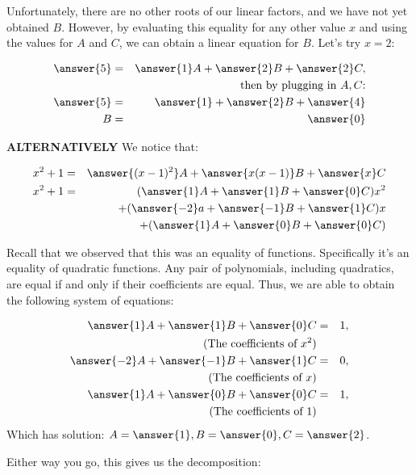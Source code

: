 \documentclass{ximera}
\begin{document}
\begin{explanation}
Unfortunately, there are no other roots of our linear factors, and we have not yet obtained $B$.  However, by evaluating this equality for any other value $x$ and using the values for $A$ and $C$, we can obtain a linear equation for $B$.  Let's try $x=2$:

\begin{eqnarray*}
\answer{5}&=&\answer{1}A+\answer{2}B+\answer{2}C,\\
&& \text{then by plugging in $A,C$:}\\
\answer{5}&=&\answer{1}+\answer{2}B+\answer{4}\\
B&=&\answer{0}
\end{eqnarray*}

\textbf{ALTERNATIVELY} We notice that:

\begin{eqnarray*}
x^2+1&=&\answer{(x-1)^2}A+\answer{x(x-1)}B+\answer{x}C\\
x^2+1&=&(\answer{1}A+\answer{1}B+\answer{0}C)x^2\\
&&+(\answer{-2}a+\answer{-1}B+\answer{1}C)x\\
&&+(\answer{1}A+\answer{0}B+\answer{0}C)
\end{eqnarray*}

Recall that we observed that this was an equality of functions.  Specifically it's an equality of quadratic functions.  Any pair of polynomials, including quadratics, are equal if and only if their coefficients are equal.  Thus, we are able to obtain the following system of equations:

\begin{eqnarray*}
\answer{1}A+\answer{1}B+\answer{0}C&=&1,\\ \text{(The coefficients of $x^2$)}&&\\
\answer{-2}A+\answer{-1}B+\answer{1}C&=&0,\\ \text{(The coefficients of $x$)}&&\\
\answer{1}A+\answer{0}B+\answer{0}C&=&1,\\  \text{(The coefficients of $1$)}&&\\
\end{eqnarray*}
Which has solution: $A=\answer{1}, B=\answer{0}, C=\answer{2}$.

Either way you go, this gives us the decomposition:


\end{explanation}
\end{document}
